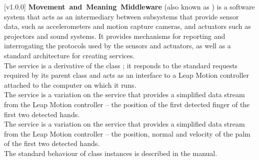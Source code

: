 [v1.0.0]
\textbf{Movement~and~Meaning~Middleware} (also known as \mplusm) is a software system
that acts as an intermediary between subsystems that provide sensor data, such as
accelerometers and motion capture cameras, and actuators such as projectors and sound
systems.
It provides mechanisms for reporting and interrogating the protocols used by the sensors
and actuators, as well as a standard architecture for creating services.\\

The \LMI{} service is a derivative of the \mplusm{} class ;
it responds to the standard requests required by its parent class and acts as an interface
to a Leap Motion controller attached to the computer on which it runs.\\

The \LTFI{} service is a variation on the \LMI{} service that provides a simplified data
stream from the Leap Motion controller -- the position of the first detected finger of
the first two detected hands.\\

The \LTPI{} service is a variation on the \LMI{} service that provides a simplified data
stream from the Leap Motion controller -- the position, normal and velocity of the palm of
the first two detected hands.\\

The standard behaviour of  class instances is described in
the \emph{\MMM} manual.
\primaryEnd{}
